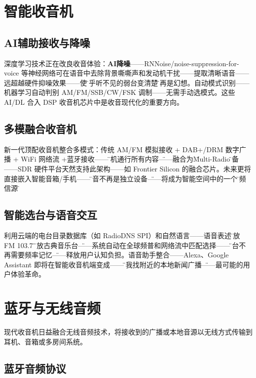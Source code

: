 \documentclass[12pt,UTF8]{ctexbook}
\begin{document}
\section{智能收音机}
\label{sec:smart_radio}

\subsection{AI辅助接收与降噪}

深度学习技术正在改良收音体验：\textbf{AI降噪}——RNNoise/noise-suppression-for-voice 等神经网络可在语音中去除背景嘶嘶声和发动机干扰——提取清晰语音——远超越硬件抑噪效果——使\"几乎听不见的弱台变清楚\"不再是幻想。自动模式识别——机器学习自动判别 AM/FM/SSB/CW/FSK 调制——无需手动选模式。这些 AI/DL 合入 DSP 收音机芯片中是收音现代化的重要方向。

\subsection{多模融合收音机}

新一代顶配收音机整合多模式：传统 AM/FM 模拟接收 + DAB+/DRM 数字广播 + WiFi 网络流 +蓝牙接收——\"一机通行所有内容\"——融合为\"Multi-Radio\"设备——SDR 硬件平台天然支持此架构——如 Frontier Silicon 的融合芯片。未来更将直接嵌入智能音箱/手机——\"收音不再是独立设备\"——将成为智能空间中的一个\"音频信源\"。

\subsection{智能选台与语音交互}

利用云端的电台目录数据库（如 RadioDNS SPI）和自然语言——语音表述\"播放 FM 103.7\"或\"播放古典音乐台\"——系统自动在全球频普和网络流中匹配选择——\"选台不再需要频率记忆\"——释放用户认知负担。语音助手整合——Alexa、Google Assistant 即将在智能收音机端变成——\"帮我找附近的本地新闻广播\"——最可能的用户体验革命。

\section{蓝牙与无线音频}
\label{sec:bluetooth_wireless_audio}

现代收音机日益融合无线音频技术，将接收到的广播或本地音源以无线方式传输到耳机、音箱或多房间系统。

\subsection{蓝牙音频协议}
\end{document}

